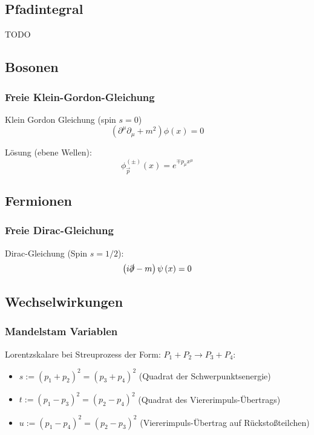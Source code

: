 \documentclass[11pt]{article}
\numberwithin{equation}{section}
\begin{document}
    \subsection{Pfadintegral}
      TODO

    \subsection{Bosonen}
      \subsubsection{Freie Klein-Gordon-Gleichung}
        Klein Gordon Gleichung (spin $s=0$)
        \begin{equation}
          \left(\partial^\mu\partial_\mu+m^2\right) \phi(x) = 0
        \end{equation}

        Lösung (ebene Wellen):
        \begin{equation}
          {\phi}^{ ( \pm ) }_{\vec{p}} (x) = e^{\mp p_\mu x^\mu}
        \end{equation}

    \subsection{Fermionen}
      \subsubsection{Freie Dirac-Gleichung}
        Dirac-Gleichung (Spin $s=1/2$):
        \begin{equation}
          \left(  i\slashed{\partial} - m  \right) \psi\left( x \right) = 0
        \end{equation}





    \subsection{Wechselwirkungen}
      \subsubsection{Mandelstam Variablen}
        Lorentzskalare bei Streuprozess der Form: $P_1 + P_2 \rightarrow P_3 + P_4$:
        \begin{itemize}\itemsep -0pt  %
          \item $s:=(p_1+p_2)^2=(p_3+p_4)^2$ \hfill{(Quadrat der Schwerpunktsenergie)}
          \item $t:=(p_1-p_3)^2=(p_2-p_4)^2$ \hfill{(Quadrat des Viererimpuls-Übertrags)}
          \item $u:=(p_1-p_4)^2=(p_2-p_3)^2$ \hfill{(Viererimpuls-Übertrag auf Rückstoßteilchen)}
        \end{itemize}
\end{document}
